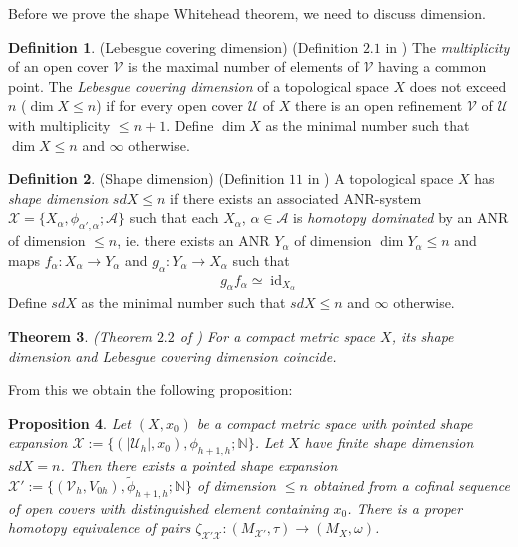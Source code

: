 \documentclass[a4paper,11pt]{article}
\theoremstyle{definition}
\newtheorem{definition}{Definition}[section]
\theoremstyle{plain}
\newtheorem{theorem}[definition]{Theorem}
\newtheorem{prop}[definition]{Proposition}
\theoremstyle{remark}
\DeclareMathOperator{\id}{id}
\begin{document}
{Before we prove the shape Whitehead theorem, we need to discuss dimension. 


\begin{definition} (Lebesgue covering dimension) (Definition $2.1$ in \cite{DRANISHNIKOV2018429}) The \textit{multiplicity} of an open cover $\mathcal{V}$ is the maximal number of elements of $\mathcal{V}$ having a common point. The \textit{Lebesgue covering dimension} of a topological space $X$ does not exceed $n$ ($\dim X\leq n$) if for every open cover $\mathcal{U}$ of $X$ there is an open refinement $\mathcal{V}$ of $\mathcal{U}$ with multiplicity $\leq n+1$. Define $\dim X$ as the minimal number such that $\dim X\leq n$ and $\infty$ otherwise.
\end{definition}

\begin{definition} (Shape dimension) (Definition $11$ in \cite{gevorgyan2021shape}) A topological space $X$ has \textit{shape dimension} $sd X\leq n$ if there exists an associated ANR-system $\mathcal{X}=\{X_{\alpha}, \phi_{\alpha',\alpha}; \mathcal{A}\}$ such that each $X_{\alpha}$, $\alpha \in \mathcal{A}$ is \textit{homotopy dominated} by an ANR of dimension $\leq n$, ie. there exists an ANR $Y_{\alpha}$ of dimension $\dim Y_{\alpha}\leq n$ and maps $f_{\alpha}: X_{\alpha}\rightarrow Y_{\alpha}$ and $g_{\alpha}: Y_{\alpha} \rightarrow X_{\alpha}$ such that
\begin{align*}
g_{\alpha}f_{\alpha} \simeq \id_{X_{\alpha}}
\end{align*} 
Define $sd X$ as the minimal number such that $sd X\leq n$ and $\infty$ otherwise.
\end{definition}


\begin{theorem} (Theorem $2.2$ of \cite{DRANISHNIKOV2018429}) For a compact metric space $X$, its shape dimension and Lebesgue covering dimension coincide.
\end{theorem} 

From this we obtain the following proposition:

\begin{prop} \label{finitedim} Let $(X,x_0)$ be a compact metric space with pointed shape expansion $\mathcal{X}:=\{(|\mathcal{U}_{h}|,x_0),\phi_{h+1,h};\mathbb{N}\}$.  Let $X$ have finite shape dimension $sd X = n$. Then there exists a pointed shape expansion $\mathcal{X'}:=\{(\mathcal{V}_{h}, V_{0h}),\tilde{\phi}_{h+1,h}; \mathbb{N}\}$ of dimension $\leq n$ obtained from a cofinal sequence of open covers with distinguished element containing $x_0$. There is a proper homotopy equivalence of pairs $\zeta_{\mathcal{X'}\mathcal{X}}: (M_{\mathcal{X}'}, \tau) \rightarrow (M_{X},\omega)$. 
\end{prop}

}
\end{document}
